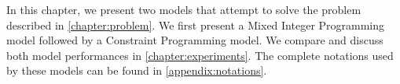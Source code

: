 \documentclass[../../thesis.tex]{subfiles}
\begin{document}
In this chapter, we present two models that attempt to solve the problem described in \autoref{chapter:problem}.
We first present 
a Mixed Integer Programming model followed by a Constraint Programming model.
We compare and discuss both model performances in \autoref{chapter:experiments}. 
The complete notations used by these models can be found in \autoref{appendix:notations}.
\end{document}
